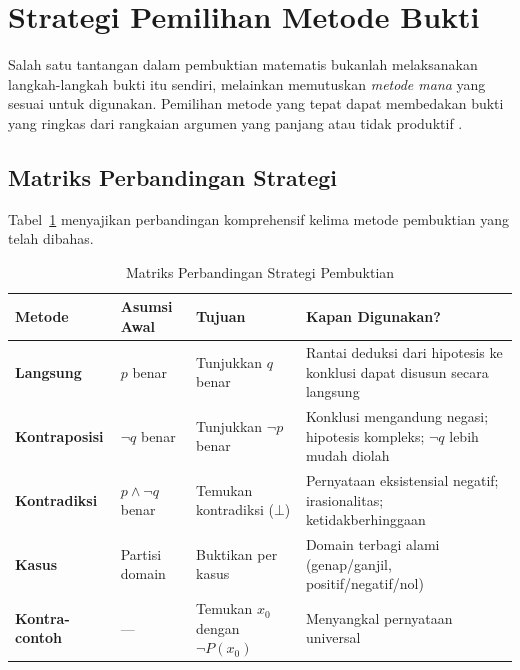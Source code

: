 \section{Strategi Pemilihan Metode Bukti}

Salah satu tantangan dalam pembuktian matematis bukanlah melaksanakan langkah-langkah bukti itu sendiri, melainkan memutuskan \emph{metode mana} yang sesuai untuk digunakan. Pemilihan metode yang tepat dapat membedakan bukti yang ringkas dari rangkaian argumen yang panjang atau tidak produktif \cite{velleman2019}.

\subsection{Matriks Perbandingan Strategi}

Tabel~\ref{tab:perbandingan-strategi-bukti} menyajikan perbandingan komprehensif kelima metode pembuktian yang telah dibahas.

\begin{table}[H]
\centering
\footnotesize
\renewcommand{\arraystretch}{1.4}
\begin{tabular}{|>{\raggedright\arraybackslash}p{2.25cm}|>{\raggedright\arraybackslash}p{1.9cm}|>{\raggedright\arraybackslash}p{1.7cm}|>{\raggedright\arraybackslash}p{5.1cm}|}
\hline
\textbf{Metode} & \textbf{Asumsi Awal} & \textbf{Tujuan} & \textbf{Kapan Digunakan?} \\ \hline
\textbf{Langsung} & $p$ benar & Tunjukkan $q$ benar & Rantai deduksi dari hipotesis ke konklusi dapat disusun secara langsung \\ \hline
\textbf{Kontraposisi} & $\neg q$ benar & Tunjukkan $\neg p$ benar & Konklusi mengandung negasi; hipotesis kompleks; $\neg q$ lebih mudah diolah \\ \hline
\textbf{Kontradiksi} & $p \wedge \neg q$ benar & Temukan kontradiksi ($\bot$) & Pernyataan eksistensial negatif; irasionalitas; ketidakberhinggaan \\ \hline
\textbf{Kasus} & Partisi domain & Buktikan per kasus & Domain terbagi alami (genap/ganjil, positif/negatif/nol) \\ \hline
\textbf{Kontra-contoh} & --- & Temukan $x_0$ dengan $\neg P(x_0)$ & Menyangkal pernyataan universal \\ \hline
\end{tabular}
\caption{Matriks Perbandingan Strategi Pembuktian}
\label{tab:perbandingan-strategi-bukti}
\end{table}

